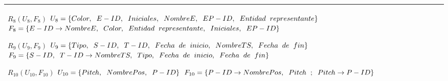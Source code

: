 \documentclass{report}
\begin{document}
\begin{tabularx}{\textwidth}{|X|}
        $ R_{8} ( U_{8} , F_{8} ) $ \newline 
        $ U_{8} = \{{Color, \hspace{0.2cm}  E-ID, \hspace{0.2cm}  Iniciales, \hspace{0.2cm}  NombreE, \hspace{0.2cm}  EP-ID, \hspace{0.2cm}  Entidad \hspace{0.2cm} representante}\} $ \newline 
        $ F_{8} = \{E-ID \rightarrow NombreE, \hspace{0.2cm} Color, \hspace{0.2cm} Entidad \hspace{0.2cm} representante, \hspace{0.2cm} Iniciales, \hspace{0.2cm} EP-ID \} $\newline 
        
        $ R_{9} ( U_{9} , F_{9} ) $ \newline 
        $ U_{9} = \{{Tipo, \hspace{0.2cm}  S-ID, \hspace{0.2cm}  T-ID, \hspace{0.2cm}  Fecha \hspace{0.2cm} de \hspace{0.2cm} inicio, \hspace{0.2cm}  NombreTS, \hspace{0.2cm}  Fecha \hspace{0.2cm} de \hspace{0.2cm} fin}\} $ \newline 
        $ F_{9} = \{S-ID, \hspace{0.2cm} T-ID \rightarrow NombreTS, \hspace{0.2cm} Tipo, \hspace{0.2cm} Fecha \hspace{0.2cm} de \hspace{0.2cm} inicio, \hspace{0.2cm} Fecha \hspace{0.2cm} de \hspace{0.2cm} fin \} $\newline 
        
        $ R_{10} ( U_{10} , F_{10} ) $ \newline 
        $ U_{10} = \{{Pitch, \hspace{0.2cm}  NombrePos, \hspace{0.2cm}  P-ID}\} $ \newline 
        $ F_{10} = \{P-ID \rightarrow NombrePos, \hspace{0.2cm} Pitch \hspace{0.2cm} ; \hspace{0.2cm}Pitch \rightarrow P-ID \} $ \newline \\
               
        \bottomrule
    \end{tabularx}
\end{document}
